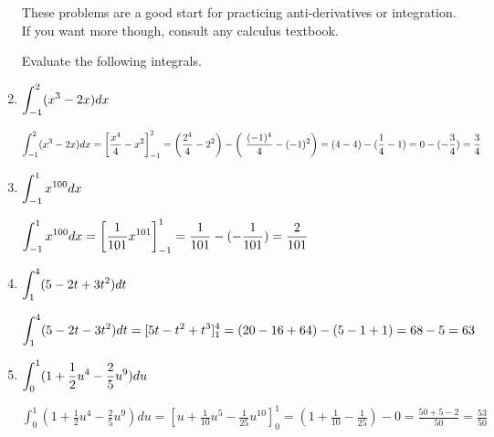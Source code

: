 \begin{enumerate}[1.]
\begin{Question}
  These problems are a good start for practicing anti-derivatives or
  integration.  If you want more though, consult any calculus
  textbook.
\end{Question}

\begin{Question}
Evaluate the following integrals.
\end{Question}

\item \begin{Question}
  $\displaystyle \int_{-1}^2 (x^3 - 2x) dx$
\end{Question}

\begin{Solution}
  $\displaystyle \int_{-1}^2 (x^3 - 2x) dx = \left[ \frac{x^4}{4} - x^2 
    \right]_{-1}^2 = \left( \frac{2^4}{4} - 2^2 \right) - \left( \
      \frac{(-1)^4}{4} - (-1)^2 \right) = (4 - 4) - (\frac{1}{4} - 1) = 0
    - (- \frac{3}{4}) = \frac{3}{4}$
\end{Solution}

\item \begin{Question}
  $\displaystyle \int_{-1}^1 x^{100} dx$
\end{Question}

\begin{Solution}
  $\displaystyle \int_{-1}^1 x^{100} dx = \left[ \frac{1}{101} x^{101} 
    \right]_{-1}^{1} = \frac{1}{101} - (- \frac{1}{101}) = 
    \frac{2}{101}$
\end{Solution}

\item \begin{Question}
  $\displaystyle \int_{1}^4 (5 - 2t +3t^2) dt$
\end{Question}

\begin{Solution}
  $\displaystyle \int_1^4 (5 - 2t - 3t^2) dt = [5t - t^2 + t^3]_1^4 = 
    (20 - 16 + 64) - (5 - 1 + 1) = 68 - 5 = 63$
\end{Solution}

\item \begin{Question}
  $\displaystyle \int_0^1 (1 + \frac{1}{2} u^4 - \frac{2}{5} u^9) du$
\end{Question}

\begin{Solution}
  $\int_0^1 (1 + \frac{1}{2} u^4 - \frac{2}{5} u^9) du = 
    [u + \frac{1}{10} u^5 - \frac{1}{25} u^10]_0^1 = 
    (1 + \frac{1}{10} - \frac{1}{25}) - 0 = \frac{50 + 5 - 2}{50} = \frac{53}{50}$
\end{Solution}


\end{enumerate}
